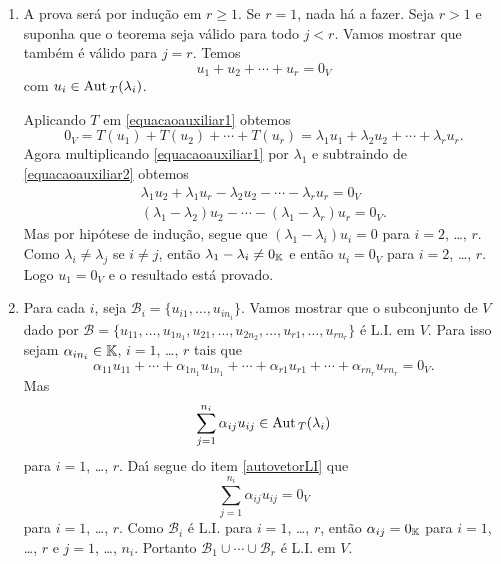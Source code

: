 \begin{prova}
    \begin{enumerate}[label={\roman*})]
        \item A prova ser\'a por indu\c{c}\~ao em $r \ge 1$. Se $r = 1$, nada h\'a a fazer. Seja $r > 1$ e suponha que o teorema seja v\'alido para todo $j < r$. Vamos mostrar que tamb\'em \'e v\'alido para $j = r$. Temos
        \begin{equation}\label{equacaoauxiliar1}
            u_1 + u_2 + \cdots + u_r = 0_V
        \end{equation}
        com $u_i \in {\rm Aut\,}_T(\lambda_i)$.

        Aplicando $T$ em \eqref{equacaoauxiliar1} obtemos
        \begin{equation}\label{equacaoauxiliar2}
            0_V = T(u_1) + T(u_2) + \cdots + T(u_r) = \lambda_1u_1 + \lambda_2u_2 + \cdots + \lambda_ru_r.
        \end{equation}
        Agora multiplicando \eqref{equacaoauxiliar1} por $\lambda_1$ e subtraindo de \eqref{equacaoauxiliar2} obtemos
        \begin{align*}
            \lambda_1u_2 + \lambda_1u_r - \lambda_2u_2 - \cdots - \lambda_ru_r = 0_V\\
            (\lambda_1 - \lambda_2)u_2 - \cdots - (\lambda_1 - \lambda_r)u_r = 0_V.
        \end{align*}
        Mas por hip\'otese de indu\c{c}\~ao, segue que $(\lambda_1 - \lambda_i)u_i = 0$ para $i = 2$, \dots, $r$. Como $\lambda_i \ne \lambda_j$ se $i \ne j$, ent\~ao $\lambda_1 - \lambda_i \ne 0_{\mathbb{K}}$ e ent\~ao $u_i = 0_V$ para $i = 2$, \dots, $r$. Logo $u_1 = 0_V$ e o resultado est\'a provado.
        \item Para cada $i$, seja $\mathcal{B}_i = \{u_{i1}, \dots, u_{in_i}\}$. Vamos mostrar que o subconjunto de $V$ dado por $\mathcal{B} = \{u_{11}, \dots, u_{1n_1}, u_{21}, \dots, u_{2n_2}, \dots, u_{r1}, \dots, u_{rn_r}\}$ \'e L.I. em $V$. Para isso sejam $\alpha_{in_i} \in \mathbb{K}$, $i = 1$, \dots, $r$ tais que
        \[
            \alpha_{11}u_{11} + \cdots + \alpha_{1n_1}u_{1n_1} + \cdots + \alpha_{r1}u_{r1} + \cdots + \alpha_{rn_r}u_{rn_r} = 0_V.
        \]
        Mas
        \[
            \sum_{j = 1}^{n_i}\alpha_{ij}u_{ij} \in {\rm Aut\,}_T(\lambda_i)
        \]
        para $i = 1$, \dots, $r$. Da{\'\i} segue do item \ref{autovetorLI} que
        \[
            \sum_{j = 1}^{n_i}\alpha_{ij}u_{ij} = 0_V
        \]
        para $i = 1$, \dots, $r$. Como $\mathcal{B}_i$ \'e L.I. para $i = 1$, \dots, $r$, ent\~ao $\alpha_{ij} = 0_{\mathbb{K}}$ para $i = 1$, \dots, $r$ e $j = 1$, \dots, $n_i$. Portanto $\mathcal{B}_1 \cup \cdots \cup \mathcal{B}_r$ \'e L.I. em $V$.
    \end{enumerate}
\end{prova}

